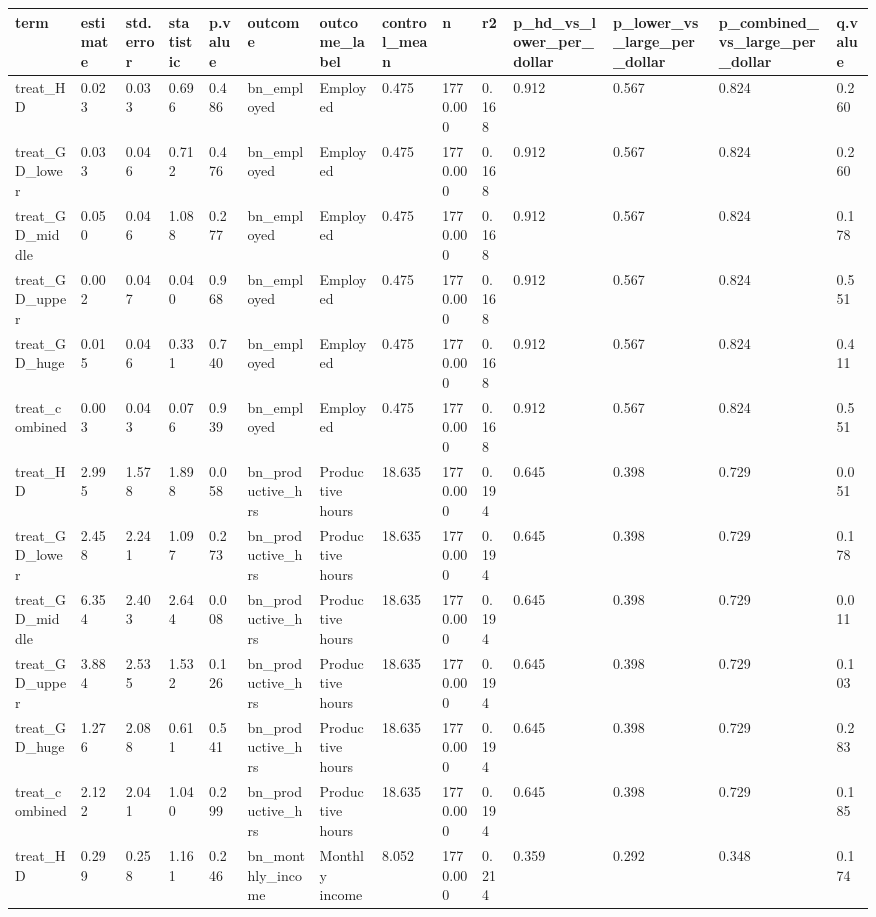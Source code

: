 \begin{tabular}{llllllllllllll}
\toprule
term & estimate & std.error & statistic & p.value & outcome & outcome\_label & control\_mean & n & r2 & p\_hd\_vs\_lower\_per\_dollar & p\_lower\_vs\_large\_per\_dollar & p\_combined\_vs\_large\_per\_dollar & q.value
 \\
\midrule
treat\_HD & 0.023 & 0.033 & 0.696 & 0.486 & bn\_employed & Employed & 0.475 & 1770.000 & 0.168 & 0.912 & 0.567 & 0.824 & 0.260 \\
treat\_GD\_lower & 0.033 & 0.046 & 0.712 & 0.476 & bn\_employed & Employed & 0.475 & 1770.000 & 0.168 & 0.912 & 0.567 & 0.824 & 0.260 \\
treat\_GD\_middle & 0.050 & 0.046 & 1.088 & 0.277 & bn\_employed & Employed & 0.475 & 1770.000 & 0.168 & 0.912 & 0.567 & 0.824 & 0.178 \\
treat\_GD\_upper & 0.002 & 0.047 & 0.040 & 0.968 & bn\_employed & Employed & 0.475 & 1770.000 & 0.168 & 0.912 & 0.567 & 0.824 & 0.551 \\
treat\_GD\_huge & 0.015 & 0.046 & 0.331 & 0.740 & bn\_employed & Employed & 0.475 & 1770.000 & 0.168 & 0.912 & 0.567 & 0.824 & 0.411 \\
treat\_combined & 0.003 & 0.043 & 0.076 & 0.939 & bn\_employed & Employed & 0.475 & 1770.000 & 0.168 & 0.912 & 0.567 & 0.824 & 0.551 \\
treat\_HD & 2.995 & 1.578 & 1.898 & 0.058 & bn\_productive\_hrs & Productive hours & 18.635 & 1770.000 & 0.194 & 0.645 & 0.398 & 0.729 & 0.051 \\
treat\_GD\_lower & 2.458 & 2.241 & 1.097 & 0.273 & bn\_productive\_hrs & Productive hours & 18.635 & 1770.000 & 0.194 & 0.645 & 0.398 & 0.729 & 0.178 \\
treat\_GD\_middle & 6.354 & 2.403 & 2.644 & 0.008 & bn\_productive\_hrs & Productive hours & 18.635 & 1770.000 & 0.194 & 0.645 & 0.398 & 0.729 & 0.011 \\
treat\_GD\_upper & 3.884 & 2.535 & 1.532 & 0.126 & bn\_productive\_hrs & Productive hours & 18.635 & 1770.000 & 0.194 & 0.645 & 0.398 & 0.729 & 0.103 \\
treat\_GD\_huge & 1.276 & 2.088 & 0.611 & 0.541 & bn\_productive\_hrs & Productive hours & 18.635 & 1770.000 & 0.194 & 0.645 & 0.398 & 0.729 & 0.283 \\
treat\_combined & 2.122 & 2.041 & 1.040 & 0.299 & bn\_productive\_hrs & Productive hours & 18.635 & 1770.000 & 0.194 & 0.645 & 0.398 & 0.729 & 0.185 \\
treat\_HD & 0.299 & 0.258 & 1.161 & 0.246 & bn\_monthly\_income & Monthly income & 8.052 & 1770.000 & 0.214 & 0.359 & 0.292 & 0.348 & 0.174 \\

\end{tabular}
